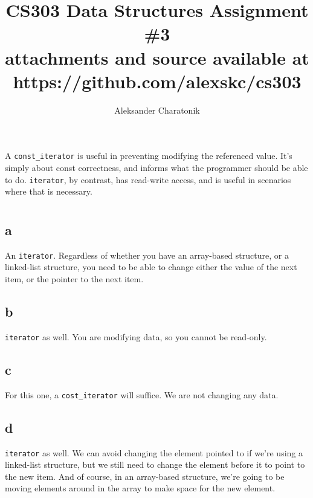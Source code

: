 \documentclass[12pt]{article}
\title{CS303 Data Structures Assignment \#3\\
\large attachments and source available at https://github.com/alexskc/cs303}
\author{Aleksander Charatonik}
\begin{document}
\maketitle

\section{}
A \texttt{const\_iterator} is useful in preventing modifying the referenced value. It's simply about const correctness, and informs what the programmer should be able to do. \texttt{iterator}, by contrast, has read-write access, and is useful in scenarios where that is necessary.

\section{}
\subsection*{a}
An \texttt{iterator}. Regardless of whether you have an array-based structure, or a linked-list structure, you need to be able to change either the value of the next item, or the pointer to the next item.
\subsection*{b}
\texttt{iterator} as well. You are modifying data, so you cannot be read-only.
\subsection*{c}
For this one, a \texttt{cost\_iterator} will suffice. We are not changing any data.
\subsection*{d}
\texttt{iterator} as well. We can avoid changing the element pointed to if we're using a linked-list structure, but we still need to change the element before it to point to the new item. And of course, in an array-based structure, we're going to be moving elements around in the array to make space for the new element.
\end{document}
